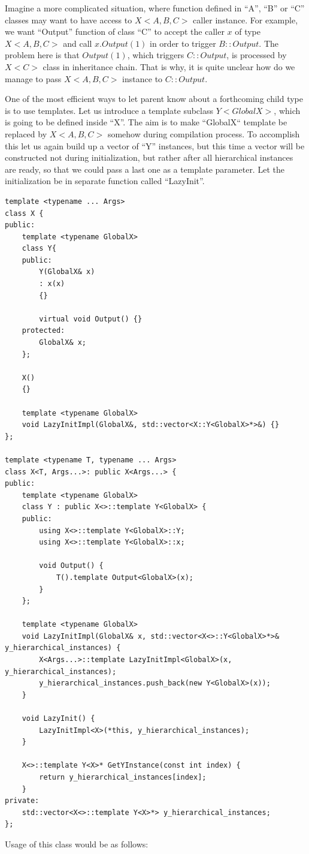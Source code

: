 \documentclass{article}
\begin{document}
Imagine a more complicated situation, where function defined in ``A'', ``B'' or ``C'' classes may want to have access to $X<A,B,C>$ caller instance. For example, we want ``Output'' function of class ``C'' to accept the caller $x$ of type $X<A,B,C>$ and call $x.Output(1)$ in order to trigger $B::Output$. The problem here is that $Output(1)$, which triggers $C::Output$, is processed by $X<C>$ class in inheritance chain. That is why, it is quite unclear how do we manage to pass $X<A,B,C>$ instance to $C::Output$.

One of the most efficient ways to let parent know about a forthcoming child type is to use templates. Let us introduce a template subclass $Y<GlobalX>$, which is going to be defined inside ``X''. The aim is to make ``GlobalX`` template be replaced by $X<A,B,C>$ somehow during compilation process. To accomplish this let us again build up a vector of ``Y'' instances, but this time a vector will be constructed not during initialization, but rather after all hierarchical instances are ready, so that we could pass a last one as a template parameter. Let the initialization be in separate function called ``LazyInit''.
\begin{lstlisting}
template <typename ... Args>
class X {
public:
	template <typename GlobalX>
	class Y{
    public:
		Y(GlobalX& x)
		: x(x)
		{}

		virtual void Output() {}
	protected:
		GlobalX& x;
	};

	X()
	{}

    template <typename GlobalX>
    void LazyInitImpl(GlobalX&, std::vector<X::Y<GlobalX>*>&) {}
};

template <typename T, typename ... Args>
class X<T, Args...>: public X<Args...> {
public:
	template <typename GlobalX>
	class Y : public X<>::template Y<GlobalX> {
    public:
		using X<>::template Y<GlobalX>::Y;
        using X<>::template Y<GlobalX>::x;

		void Output() {
			T().template Output<GlobalX>(x);
		}
	};

	template <typename GlobalX>
	void LazyInitImpl(GlobalX& x, std::vector<X<>::Y<GlobalX>*>& y_hierarchical_instances) {
		X<Args...>::template LazyInitImpl<GlobalX>(x, y_hierarchical_instances);
		y_hierarchical_instances.push_back(new Y<GlobalX>(x));
	}

	void LazyInit() {
		LazyInitImpl<X>(*this, y_hierarchical_instances);
	}

	X<>::template Y<X>* GetYInstance(const int index) {
		return y_hierarchical_instances[index];
	}
private:
	std::vector<X<>::template Y<X>*> y_hierarchical_instances;
};
\end{lstlisting}
Usage of this class would be as follows:
\end{document}
